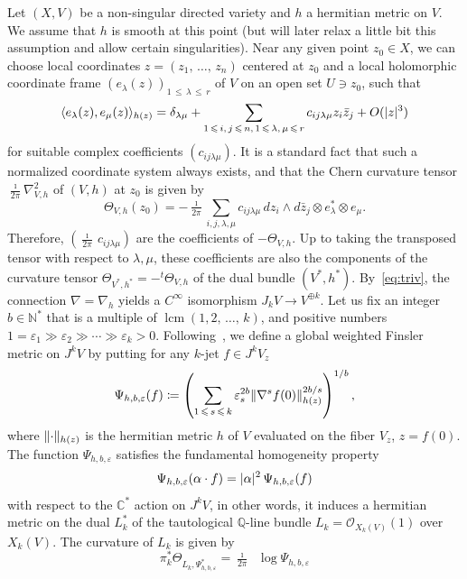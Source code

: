 \documentclass[AHL,Unicode,longabstracts,published]{cedram}
\DeclareMathOperator{\lcm}{lcm}
\DeclareMathOperator{\ddbar}{\partial\bar\partial}
\DeclarePairedDelimiter{\abs}{\lvert}{\rvert}
\DeclarePairedDelimiter{\Abs}{\lVert}{\rVert}
\newcommand*\cO{\mathcal{O}}
\newcommand*\bC{\mathbb{C}}
\newcommand*\bN{\mathbb{N}}
\newcommand*\bQ{\mathbb{Q}}
\let\leq\leqslant
\newcommand*\bydef{\coloneqq}
\begin{document}
Let $(X,V)$ be a non-singular directed variety and $h$ a hermitian metric on $V$. We assume that $h$ is smooth at this point (but will later relax a little bit this assumption and allow certain singularities). Near any given point $z_0\in X$, we can choose local coordinates
$z=(z_1,\,\dotsc,\,z_n)$ centered at $z_0$ and a local holomorphic coordinate frame
$(e_\lambda(z))_{1\,\leq\,\lambda\,\leq\,r}$ of $V$ on an open set $U\ni z_0$, such that
\begin{equation}\label{eq:frame}
\langle e_\lambda(z),e_\mu(z)\rangle_{h(z)} =\delta_{\lambda\mu}+
\sum_{1\,\leq\,i,\,j\,\leq\,n,\,1\,\leq\,\lambda,\,\mu\,\leq\,r}c_{ij\lambda\mu}z_i\bar z_j+ O(\abs{z}^3)
\end{equation}
for suitable complex coefficients $(c_{ij\lambda\mu})$. It is a standard fact that such a normalized coordinate system always exists, and that the Chern curvature tensor $\tfrac{\imath}{ 2\pi}\nabla^2_{V,h}$ of $(V,h)$ at $z_0$ is given by
\[
\Theta_{V,h}(z_0)=-\tfrac{\imath}{ 2\pi}
\sum_{i,j,\lambda,\mu} c_{ij\lambda\mu}\,dz_i\wedge d\bar z_j\otimes e_\lambda^*\otimes e_\mu.
\]
Therefore, $(\tfrac{\imath}{ 2\pi}\,c_{ij\lambda\mu})$ are the coefficients of
$-\Theta_{V,h}$. Up to taking the transposed tensor with respect to $\lambda,\mu$, these coefficients are also the components of the curvature tensor
$\Theta_{V^*,h^*}=-{}^t\Theta_{V,h}$ of the dual bundle $(V^*,h^*)$. By~\eqref{eq:triv}, the connection $\nabla=\nabla_h$ yields a $C^\infty$ isomorphism $J_kV\to V^{\oplus k}$. Let us fix an integer $b\in\bN^*$ that is a multiple of $\lcm(1,2,\,\dotsc,\,k)$, and positive numbers
$1=\varepsilon_1\gg\varepsilon_2\gg\cdots\gg \varepsilon_k>0$. Following~\cite{Dem11}, we define a global weighted Finsler metric on $J^kV$ by putting for any $k$-jet $f\in J^kV_z$
\[
\Psi_{h,b,\varepsilon}(f)
\bydef
\left(
\sum_{1\,\leq\,s\,\leq\,k}
\varepsilon_s^{2b}
\Abs{\nabla^s f(0)}_{h(z)}^{2b/s}
\right)^{1/b},
\]
where $\Abs{\cdot}_{h(z)}$ is the hermitian metric $h$ of $V$ evaluated on the fiber $V_z$, $z=f(0)$. The function $\Psi_{h,b,\varepsilon}$ satisfies the fundamental homogeneity property
\[
\Psi_{h,b,\varepsilon}(\alpha\cdot f) =
\abs{\alpha}^2\,\Psi_{h,b,\varepsilon}(f)
\]
with respect to the $\bC^*$ action on $J^kV$, in other words, it induces a hermitian metric on the dual $L_k^*$ of the tautological $\bQ$-line bundle
$L_k=\cO_{X_k(V)}(1)$ over $X_k(V)$. The curvature of $L_k$ is given by
\begin{equation}\label{eq:curvature}
\pi_k^*\Theta_{L_k,\Psi^*_{h,b,\varepsilon}}=\tfrac{\imath}{ 2\pi}\ddbar
\log\Psi_{h,b,\varepsilon}
\end{equation}
\end{document}

